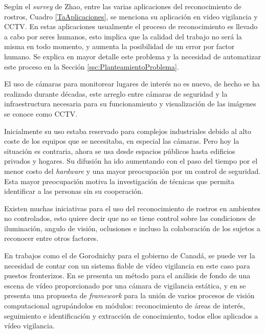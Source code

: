 Según el \textit{survey} de Zhao\cite{zhao2003face}, entre las varias aplicaciones del reconocimiento de rostros, Cuadro \ref{TaAplicaciones}, se menciona su aplicación en video vigilancia y \ac{CCTV}. En estas aplicaciones usualmente el proceso de reconocimiento es llevado a cabo por seres humanos, esto implica que la calidad del trabajo no será la misma en todo momento, y aumenta la posibilidad de un error por factor humano. Se explica en mayor detalle este problema y la necesidad de automatizar este proceso en la Sección \ref{ssc:PlanteamientoProblema}.

El uso de cámaras para monitorear lugares de interés no es nuevo, de hecho se ha realizado durante décadas, este arreglo entre cámaras de seguridad y la infraestructura necesaria para su funcionamiento y visualización de las imágenes se conoce como \ac{CCTV}. 

Inicialmente su uso estaba reservado para complejos industriales debido al alto coste de los equipos que se necesitaba, en especial las cámaras. Pero hoy la situación es contraria, ahora se usa desde espacios públicos hasta edificios privados y hogares. Su difusión ha ido aumentando con el paso del tiempo por el menor costo del \textit{hardware} y una mayor preocupación por un control de seguridad. Esta mayor preocupación motiva la investigación de técnicas que permita identificar a las personas sin su cooperación.

Existen muchas iniciativas para el uso del reconocimiento de rostros en ambientes no controlados, esto quiere decir que no se tiene control sobre las condiciones de iluminación, angulo de visión, oclusiones e incluso la colaboración de los sujetos a reconocer entre otros factores.
 
En trabajos como el de Gorodnichy \cite{gorodnichy2014survey} para el gobierno de Canadá, se puede ver la necesidad de contar con un sistema fiable de vídeo vigilancia en este caso para puestos fronterizos. En  \cite{tian2005robust} se presenta un método para el análisis de fondo de una escena de vídeo proporcionado por una cámara de vigilancia estática, y en \cite{nazare2014smart} se presenta una propuesta de \textit{framework} para la unión de varios procesos de visión computacional agrupándolos en módulos: reconocimiento de áreas de interés, seguimiento e identificación y extracción de conocimiento, todos ellos aplicados a vídeo vigilancia.

